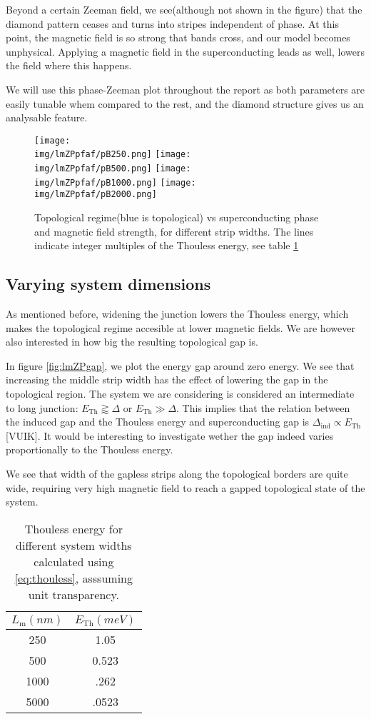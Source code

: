 \documentclass[10pt,a4paper]{article}
\newcommand{\img}{./images}
\begin{document}
		Beyond a certain Zeeman field, we see(although not shown in the figure) that the diamond pattern ceases and turns into stripes independent of phase. At this point, the magnetic field is so strong that bands cross, and our model becomes unphysical. Applying a magnetic field in the superconducting leads as well, lowers the field where this happens.
		
		We will use this phase-Zeeman plot throughout the report as both parameters are easily tunable whem compared to the rest, and the diamond structure gives us an analysable feature.
		
	\begin{figure}[H]
		\texttt{[image: \\img/lmZPpfaf/pB250.png]}
		\texttt{[image: \\img/lmZPpfaf/pB500.png]}
		\texttt{[image: \\img/lmZPpfaf/pB1000.png]}
		\texttt{[image: \\img/lmZPpfaf/pB2000.png]}
		\caption{Topological regime(blue is topological) vs superconducting phase and magnetic field strength, for different strip widths. The lines indicate integer multiples of the Thouless energy, see table \ref{table:thouless}}
		\label{fig:lmZPpfaf}
	\end{figure}

	\subsection{Varying system dimensions}
	 As mentioned before, widening the junction lowers the Thouless energy, which makes the topological regime accesible at lower magnetic fields. We are however also interested in how big the resulting topological gap is. 
	 
	 In figure \ref{fig:lmZPgap}, we plot the energy gap around zero energy. We see that increasing the middle strip width has the effect of lowering the gap in the topological region. The system we are considering is considered an intermediate to long junction: $E_\text{Th} \gtrapprox \Delta$ or $E_\text{Th} \gg \Delta$. This implies that the relation between the induced gap and the Thouless energy and superconducting gap is $\Delta_\text{ind} \propto E_\text{Th}$[VUIK]. It would be interesting to investigate wether the gap indeed varies proportionally to the Thouless energy.
	 
	 We see that width of the gapless strips along the topological borders are quite wide, requiring very high magnetic field to reach a gapped topological state of the system.
	\begin{table}[H]
		\centering
		\begin{tabular}{|c|c|}
			\hline 
			$L_\text{m} (nm)$ & $E_\text{Th} (meV)$ \\ 
			\hline 
			250 & 1.05 \\ 
			\hline 
			500 & 0.523 \\ 
			\hline 
			1000 & .262 \\ 
			\hline 
			5000 & .0523 \\ 
			\hline 
		\end{tabular} 
		\caption{Thouless energy for different system widths calculated using \ref{eq:thouless}, asssuming unit transparency.}
		\label{table:thouless}
	\end{table}
	
\end{document}
